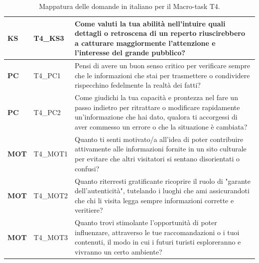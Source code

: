 \begin{table}[H]
\begin{tabular}{
        |>{\centering\arraybackslash\bfseries}p{1.5cm}
        |>{\centering\arraybackslash}p{2.2cm}
        |>{\raggedright\arraybackslash}p{9.8cm}|
    }
        \hline
        KS & T4\_KS3 & Come valuti la tua abilità nell'intuire quali dettagli o retroscena di un reperto riuscirebbero a catturare maggiormente l'attenzione e l'interesse del grande pubblico? \\
        \hline
        \rowcolor{culturiaBeige}
        PC & T4\_PC1 & Pensi di avere un buon senso critico per verificare sempre che le informazioni che stai per trasmettere o condividere rispecchino fedelmente la realtà dei fatti? \\
        \hline
        PC & T4\_PC2 & Come giudichi la tua capacità e prontezza nel fare un passo indietro per ritrattare o modificare rapidamente un'informazione che hai dato, qualora ti accorgessi di aver commesso un errore o che la situazione è cambiata? \\
        \hline
        \rowcolor{culturiaBeige}
        MOT & T4\_MOT1 & Quanto ti senti motivato/a all'idea di poter contribuire attivamente alle informazioni fornite in un sito culturale per evitare che altri visitatori si sentano disorientati o confusi? \\
        \hline
        MOT & T4\_MOT2 & Quanto riterresti gratificante ricoprire il ruolo di "garante dell'autenticità", tutelando i luoghi che ami assicurandoti che chi li visita legga sempre informazioni corrette e veritiere? \\
        \hline
        \rowcolor{culturiaBeige}
        MOT & T4\_MOT3 & Quanto trovi stimolante l'opportunità di poter influenzare, attraverso le tue raccomandazioni o i tuoi contenuti, il modo in cui i futuri turisti esploreranno e vivranno un certo ambiente? \\
        \hline
    \end{tabular}
    \vspace{0.15cm}
    \caption{Mappatura delle domande in italiano per il Macro-task T4.}
    \label{tab:domande_t4_it}
\end{table}

\vspace{0.6cm}

